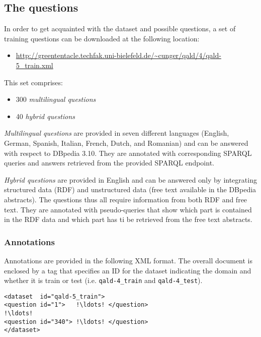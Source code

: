 \subsection{The questions}

In order to get acquainted with the dataset and possible questions, a set of training questions can be downloaded at the following location: 
\begin{itemize} 
\item \url{http://greententacle.techfak.uni-bielefeld.de/~cunger/qald/4/qald-5_train.xml} 
\end{itemize} 
This set comprises:
\begin{itemize}
\item 300 \emph{multilingual questions} 
\item 40 \emph{hybrid questions} 
\end{itemize}

\emph{Multilingual questions} are provided in seven different languages (English, German, Spanish, Italian, French, Dutch, and Romanian) 
and can be answered with respect to DBpedia 3.10. 
They are annotated with corresponding SPARQL queries and answers retrieved from the provided SPARQL endpoint. 

\emph{Hybrid questions} are provided in English and can be answered only by integrating structured data (RDF) and unstructured data 
(free text available in the DBpedia abstracts). The questions thus all require information from both RDF and free text. 
They are annotated with pseudo-queries that show which part is contained in the RDF data and which part has ti be retrieved  
from the free text abstracts. 


\subsubsection{Annotations}

Annotations are provided in the following XML format.
The overall document is enclosed by a tag that specifies an ID for the dataset indicating the domain 
and whether it is train or test (i.e. {\tt qald-4\_train} and {\tt qald-4\_test}).

\begin{lstlisting}[escapechar=!]
<dataset  id="qald-5_train">
<question id="1">   !\ldots! </question>
!\ldots!
<question id="340"> !\ldots! </question>
</dataset>
\end{lstlisting}

